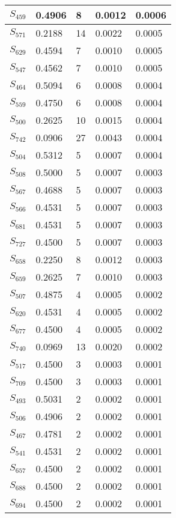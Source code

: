 \begin{xltabular}{\textwidth}{|X|X|X|X|X|}
 $S_{459}$ & 0.4906 & 8 & 0.0012 & 0.0006 \\ \hline
 $S_{571}$ & 0.2188 & 14 & 0.0022 & 0.0005 \\ \hline
 $S_{629}$ & 0.4594 & 7 & 0.0010 & 0.0005 \\ \hline
 $S_{547}$ & 0.4562 & 7 & 0.0010 & 0.0005 \\ \hline
 $S_{464}$ & 0.5094 & 6 & 0.0008 & 0.0004 \\ \hline
 $S_{559}$ & 0.4750 & 6 & 0.0008 & 0.0004 \\ \hline
 $S_{500}$ & 0.2625 & 10 & 0.0015 & 0.0004 \\ \hline
 $S_{742}$ & 0.0906 & 27 & 0.0043 & 0.0004 \\ \hline
 $S_{504}$ & 0.5312 & 5 & 0.0007 & 0.0004 \\ \hline
 $S_{508}$ & 0.5000 & 5 & 0.0007 & 0.0003 \\ \hline
 $S_{567}$ & 0.4688 & 5 & 0.0007 & 0.0003 \\ \hline
 $S_{566}$ & 0.4531 & 5 & 0.0007 & 0.0003 \\ \hline
 $S_{681}$ & 0.4531 & 5 & 0.0007 & 0.0003 \\ \hline
 $S_{727}$ & 0.4500 & 5 & 0.0007 & 0.0003 \\ \hline
 $S_{658}$ & 0.2250 & 8 & 0.0012 & 0.0003 \\ \hline
 $S_{659}$ & 0.2625 & 7 & 0.0010 & 0.0003 \\ \hline
 $S_{507}$ & 0.4875 & 4 & 0.0005 & 0.0002 \\ \hline
 $S_{620}$ & 0.4531 & 4 & 0.0005 & 0.0002 \\ \hline
 $S_{677}$ & 0.4500 & 4 & 0.0005 & 0.0002 \\ \hline
 $S_{740}$ & 0.0969 & 13 & 0.0020 & 0.0002 \\ \hline
 $S_{517}$ & 0.4500 & 3 & 0.0003 & 0.0001 \\ \hline
 $S_{709}$ & 0.4500 & 3 & 0.0003 & 0.0001 \\ \hline
 $S_{493}$ & 0.5031 & 2 & 0.0002 & 0.0001 \\ \hline
 $S_{506}$ & 0.4906 & 2 & 0.0002 & 0.0001 \\ \hline
 $S_{467}$ & 0.4781 & 2 & 0.0002 & 0.0001 \\ \hline
 $S_{541}$ & 0.4531 & 2 & 0.0002 & 0.0001 \\ \hline
 $S_{657}$ & 0.4500 & 2 & 0.0002 & 0.0001 \\ \hline
 $S_{688}$ & 0.4500 & 2 & 0.0002 & 0.0001 \\ \hline
 $S_{694}$ & 0.4500 & 2 & 0.0002 & 0.0001 \\ \hline

\end{xltabular}
